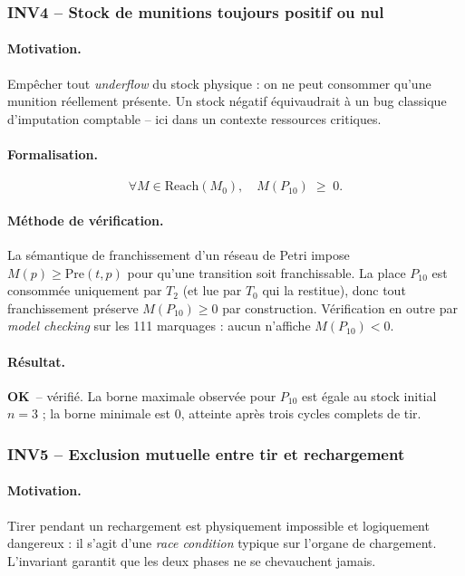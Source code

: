 \documentclass[11pt,a4paper]{article}
\newcommand{\OK}{\textcolor{green!50!black}{\textbf{OK}}}
\begin{document}
\subsubsection*{INV4 -- Stock de munitions toujours positif ou nul}

\paragraph{Motivation.}
Empêcher tout \emph{underflow} du stock physique : on ne peut consommer
qu'une munition réellement présente. Un stock négatif équivaudrait à un bug
classique d'imputation comptable -- ici dans un contexte ressources
critiques.

\paragraph{Formalisation.}
\[
\forall M \in \mathrm{Reach}(M_0),\quad M(P_{10}) \;\geq\; 0.
\]

\paragraph{Méthode de vérification.}
La sémantique de franchissement d'un réseau de Petri impose
$M(p) \geq \mathrm{Pre}(t,p)$ pour qu'une transition soit franchissable.
La place $P_{10}$ est consommée uniquement par $T_2$ (et lue par $T_0$ qui
la restitue), donc tout franchissement préserve $M(P_{10}) \geq 0$ par
construction. Vérification en outre par \emph{model checking} sur les 111
marquages : aucun n'affiche $M(P_{10}) < 0$.

\paragraph{Résultat.}
\OK\ -- vérifié. La borne maximale observée pour $P_{10}$ est égale au
stock initial $n=3$ ; la borne minimale est $0$, atteinte après trois
cycles complets de tir.

\subsubsection*{INV5 -- Exclusion mutuelle entre tir et rechargement}

\paragraph{Motivation.}
Tirer pendant un rechargement est physiquement impossible et logiquement
dangereux : il s'agit d'une \emph{race condition} typique sur l'organe de
chargement. L'invariant garantit que les deux phases ne se chevauchent
jamais.
\end{document}
